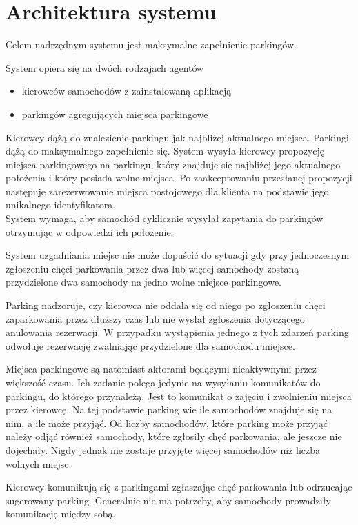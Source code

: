 \newpage
\section{Architektura systemu}
{\color{teal} Celem nadrzędnym systemu jest maksymalne zapełnienie parkingów.}

System opiera się na dwóch rodzajach agentów
\begin{itemize}
\item kierowców samochodów z zainstalowaną aplikacją
\item parkingów agregujących miejsca parkingowe
\end{itemize}

{\color{teal}Kierowcy dążą do znalezienie parkingu jak najbliżej aktualnego miejsca.
Parkingi dążą do maksymalnego zapełnienie się.}
 {\color{teal} System wysyła kierowcy propozycję miejsca parkingowego na parkingu, który znajduje się najbliżej jego aktualnego położenia i który posiada wolne miejsca. Po zaakceptowaniu przesłanej propozycji następuje zarezerwowanie miejsca postojowego dla klienta na podstawie jego unikalnego identyfikatora.}\\

{\color{teal} System wymaga, aby samochód cyklicznie wysyłał zapytania do parkingów otrzymując w odpowiedzi ich położenie. }

System uzgadniania miejsc nie może dopuścić do sytuacji gdy przy jednoczesnym zgłoszeniu chęci parkowania przez dwa lub więcej samochody zostaną przydzielone dwa samochody na jedno wolne miejsce parkingowe.

{\color{teal} Parking nadzoruje, czy kierowca nie oddala się od niego po zgłoszeniu chęci zaparkowania przez dłuższy czas lub nie wysłał zgłoszenia dotyczącego anulowania rezerwacji. W przypadku wystąpienia jednego z tych zdarzeń parking odwołuje rezerwację zwalniając przydzielone dla samochodu miejsce.}

Miejsca parkingowe są natomiast aktorami będącymi nieaktywnymi przez większość czasu. Ich zadanie polega jedynie na wysyłaniu komunikatów do parkingu, do którego przynależą. Jest to komunikat o zajęciu i zwolnieniu miejsca przez kierowcę. Na tej podstawie parking wie ile samochodów znajduje się na nim, a ile może przyjąć. Od liczby samochodów, które parking może przyjąć należy odjąć również samochody, które zgłosiły chęć parkowania, ale jeszcze nie dojechały. Nigdy jednak nie zostaje przyjęte więcej samochodów niż liczba wolnych miejsc.

Kierowcy komunikują się z parkingami zgłaszając chęć parkowania lub odrzucając sugerowany parking. Generalnie nie ma potrzeby, aby samochody prowadziły komunikację między sobą.

